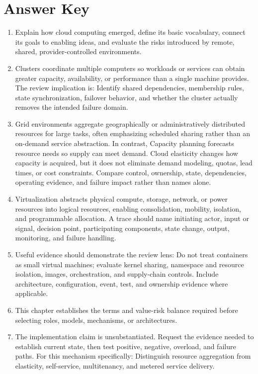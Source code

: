 \documentclass[11pt]{article}
\begin{document}
\section{Answer Key}
\begin{enumerate}
\item Explain how cloud computing emerged, define its basic vocabulary, connect its goals to enabling ideas, and evaluate the risks introduced by remote, shared, provider-controlled environments.
\item Clusters coordinate multiple computers so workloads or services can obtain greater capacity, availability, or performance than a single machine provides. The review implication is: Identify shared dependencies, membership rules, state synchronization, failover behavior, and whether the cluster actually removes the intended failure domain.
\item Grid environments aggregate geographically or administratively distributed resources for large tasks, often emphasizing scheduled sharing rather than an on-demand service abstraction. In contrast, Capacity planning forecasts resource needs so supply can meet demand. Cloud elasticity changes how capacity is acquired, but it does not eliminate demand modeling, quotas, lead times, or cost constraints. Compare control, ownership, state, dependencies, operating evidence, and failure impact rather than names alone.
\item Virtualization abstracts physical compute, storage, network, or power resources into logical resources, enabling consolidation, mobility, isolation, and programmable allocation. A trace should name initiating actor, input or signal, decision point, participating components, state change, output, monitoring, and failure handling.
\item Useful evidence should demonstrate the review lens: Do not treat containers as small virtual machines; evaluate kernel sharing, namespace and resource isolation, images, orchestration, and supply-chain controls. Include architecture, configuration, event, test, and ownership evidence where applicable.
\item This chapter establishes the terms and value-risk balance required before selecting roles, models, mechanisms, or architectures.
\item The implementation claim is unsubstantiated. Request the evidence needed to establish current state, then test positive, negative, overload, and failure paths. For this mechanism specifically: Distinguish resource aggregation from elasticity, self-service, multitenancy, and metered service delivery.

\end{enumerate}
\end{document}
